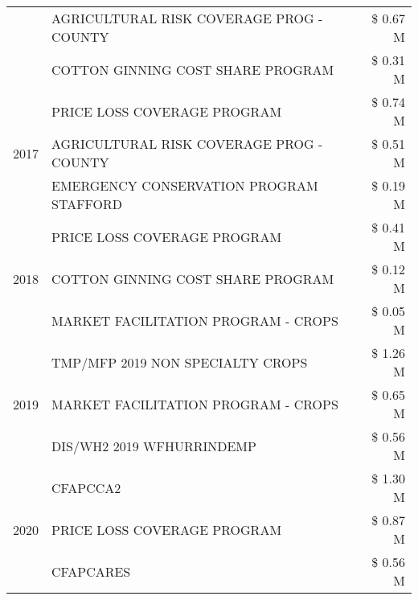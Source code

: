 \begin{tabular}{llr}
 & AGRICULTURAL RISK COVERAGE PROG - COUNTY & \$ 0.67 M \\
 & COTTON GINNING COST SHARE PROGRAM & \$ 0.31 M \\
\cline{1-3}
\multirow[t]{3}{*}{2017} & PRICE LOSS COVERAGE PROGRAM & \$ 0.74 M \\
 & AGRICULTURAL RISK COVERAGE PROG - COUNTY & \$ 0.51 M \\
 & EMERGENCY CONSERVATION PROGRAM STAFFORD & \$ 0.19 M \\
\cline{1-3}
\multirow[t]{3}{*}{2018} & PRICE LOSS COVERAGE PROGRAM & \$ 0.41 M \\
 & COTTON GINNING COST SHARE PROGRAM & \$ 0.12 M \\
 & MARKET FACILITATION PROGRAM - CROPS & \$ 0.05 M \\
\cline{1-3}
\multirow[t]{3}{*}{2019} & TMP/MFP 2019 NON SPECIALTY CROPS & \$ 1.26 M \\
 & MARKET FACILITATION PROGRAM - CROPS & \$ 0.65 M \\
 & DIS/WH2 2019 WFHURRINDEMP & \$ 0.56 M \\
\cline{1-3}
\multirow[t]{3}{*}{2020} & CFAPCCA2 & \$ 1.30 M \\
 & PRICE LOSS COVERAGE PROGRAM & \$ 0.87 M \\
 & CFAPCARES & \$ 0.56 M \\
\cline{1-3}
\bottomrule
\end{tabular}
